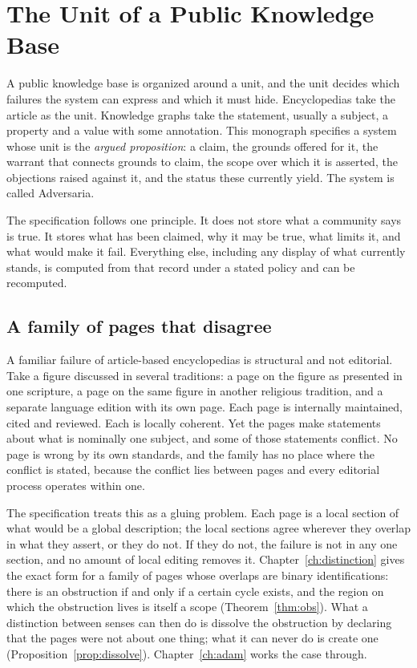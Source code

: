 \chapter{The Unit of a Public Knowledge Base}\label{ch:unit}

A public knowledge base is organized around a unit, and the unit decides which failures the system can express and which it must hide. Encyclopedias take the article as the unit. Knowledge graphs take the statement, usually a subject, a property and a value with some annotation. This monograph specifies a system whose unit is the \emph{argued proposition}: a claim, the grounds offered for it, the warrant that connects grounds to claim, the scope over which it is asserted, the objections raised against it, and the status these currently yield. The system is called Adversaria.

The specification follows one principle. It does not store what a community says is true. It stores what has been claimed, why it may be true, what limits it, and what would make it fail. Everything else, including any display of what currently stands, is computed from that record under a stated policy and can be recomputed.

\section{A family of pages that disagree}\label{sec:pagefamily}

A familiar failure of article-based encyclopedias is structural and not editorial. Take a figure discussed in several traditions: a page on the figure as presented in one scripture, a page on the same figure in another religious tradition, and a separate language edition with its own page. Each page is internally maintained, cited and reviewed. Each is locally coherent. Yet the pages make statements about what is nominally one subject, and some of those statements conflict. No page is wrong by its own standards, and the family has no place where the conflict is stated, because the conflict lies between pages and every editorial process operates within one.

The specification treats this as a gluing problem. Each page is a local section of what would be a global description; the local sections agree wherever they overlap in what they assert, or they do not. If they do not, the failure is not in any one section, and no amount of local editing removes it. Chapter~\ref{ch:distinction} gives the exact form for a family of pages whose overlaps are binary identifications: there is an obstruction if and only if a certain cycle exists, and the region on which the obstruction lives is itself a scope (Theorem~\ref{thm:obs}). What a distinction between senses can then do is dissolve the obstruction by declaring that the pages were not about one thing; what it can never do is create one (Proposition~\ref{prop:dissolve}). Chapter~\ref{ch:adam} works the case through.

